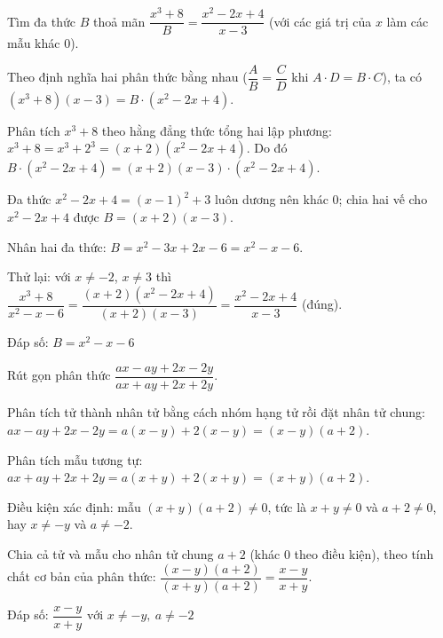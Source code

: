 \begin{problem}[8DS-PS-022]
Tìm đa thức $B$ thoả mãn $\dfrac{x^3 + 8}{B} = \dfrac{x^2 - 2x + 4}{x - 3}$ (với các giá trị của $x$ làm các mẫu khác $0$).

\begin{solution}
Theo định nghĩa hai phân thức bằng nhau ($\dfrac{A}{B} = \dfrac{C}{D}$ khi $A \cdot D = B \cdot C$), ta có $(x^3 + 8)(x - 3) = B \cdot (x^2 - 2x + 4)$.

Phân tích $x^3 + 8$ theo hằng đẳng thức tổng hai lập phương: $x^3 + 8 = x^3 + 2^3 = (x + 2)(x^2 - 2x + 4)$. Do đó $B \cdot (x^2 - 2x + 4) = (x + 2)(x - 3) \cdot (x^2 - 2x + 4)$.

Đa thức $x^2 - 2x + 4 = (x - 1)^2 + 3$ luôn dương nên khác $0$; chia hai vế cho $x^2 - 2x + 4$ được $B = (x + 2)(x - 3)$.

Nhân hai đa thức: $B = x^2 - 3x + 2x - 6 = x^2 - x - 6$.

Thử lại: với $x \neq -2$, $x \neq 3$ thì $\dfrac{x^3 + 8}{x^2 - x - 6} = \dfrac{(x + 2)(x^2 - 2x + 4)}{(x + 2)(x - 3)} = \dfrac{x^2 - 2x + 4}{x - 3}$ (đúng).

Đáp số: $\boxed{B = x^2 - x - 6}$
\end{solution}
\end{problem}

\begin{problem}[8DS-PS-023]
Rút gọn phân thức $\dfrac{ax - ay + 2x - 2y}{ax + ay + 2x + 2y}$.

\begin{solution}
Phân tích tử thành nhân tử bằng cách nhóm hạng tử rồi đặt nhân tử chung: $ax - ay + 2x - 2y = a(x - y) + 2(x - y) = (x - y)(a + 2)$.

Phân tích mẫu tương tự: $ax + ay + 2x + 2y = a(x + y) + 2(x + y) = (x + y)(a + 2)$.

Điều kiện xác định: mẫu $(x + y)(a + 2) \neq 0$, tức là $x + y \neq 0$ và $a + 2 \neq 0$, hay $x \neq -y$ và $a \neq -2$.

Chia cả tử và mẫu cho nhân tử chung $a + 2$ (khác $0$ theo điều kiện), theo tính chất cơ bản của phân thức: $\dfrac{(x - y)(a + 2)}{(x + y)(a + 2)} = \dfrac{x - y}{x + y}$.

Đáp số: $\boxed{\dfrac{x - y}{x + y} \text{ với } x \neq -y,\ a \neq -2}$
\end{solution}
\end{problem}

